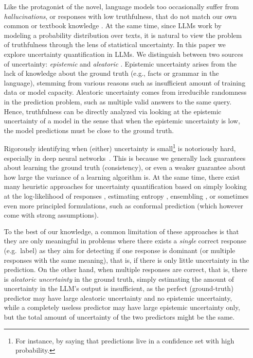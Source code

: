 \documentclass[a4paper]{article}
\theoremstyle{plain}
\theoremstyle{definition}
\theoremstyle{plain}
\begin{document}
\medskip

%
Like the protagonist of the novel, language models too occasionally suffer from \emph{hallucinations},
or responses with low truthfulness, that do not match our own common or textbook knowledge \citep{bubeck2023sparks,geminiteam2023gemini}.
%
At the same time,
since LLMs work by modeling a probability distribution over texts, it is natural
to view the problem of truthfulness through the lens of statistical uncertainty.
In this paper we explore uncertainty quantification in LLMs. We distinguish
between two sources of uncertainty: \emph{epistemic} and \emph{aleatoric}
\citep{wen2022predictions,osband2023epistemic,johnson2024experts}.  Epistemic
uncertainty arises from the lack of knowledge about the ground truth (e.g.,
facts or grammar in the language), stemming from various reasons such as insufficient
amount of training data or model capacity.  Aleatoric uncertainty comes from
irreducible randomness in the prediction problem, such as multiple valid answers
to the same query. Hence, truthfulness can be directly analyzed via looking at the epistemic uncertainty of a model in the sense that when the epistemic uncertainty is low, the model predictions must be close to the ground truth.

Rigorously identifying when (either) uncertainty is small\footnote{For instance,
  by saying that predictions live in a confidence set with high
  probability.} 
is notoriously hard, especially in deep neural networks~\citep{blundell2015weight,antoran2020depth}.
%
This is because we generally lack guarantees about learning the ground truth
(consistency), or even a weaker guarantee about how large the variance of a
learning algorithm is.  At the same time, there exist many heuristic approaches
for uncertainty quantification based on simply looking at the log-likelihood of
responses \citep{KCAHD2022}, estimating entropy \citep{KuhnARXIV2023}, ensembling
\citep{lakshminarayanan2017simple,dwaracherla2023ensembles,osband2023epistemic},
or sometimes even more principled formulations, such as conformal prediction
\citep{angelopoulos2023conformal,RavfogelACL2023,conformal-abstention-2024}
(which however come with strong assumptions).

To the best of our knowledge, a common limitation of these approaches is that
they are only meaningful in problems where there exists a \emph{single} correct
response (e.g.\ label) as they aim for detecting if one response is dominant (or
multiple responses with the same meaning), that is, if there is only little uncertainty in the prediction.
%
On the other hand, when multiple responses are correct, that is, there is \emph{aleatoric uncertainty} in the ground truth, simply estimating the amount of uncertainty in the LLM's output is insufficient, as the perfect (ground-truth) predictor may have large aleatoric uncertainty and no epistemic uncertainty, while a completely useless predictor may have large epistemic uncertainty only, but the total amount of uncertainty of the two predictors might be the same.
\end{document}
